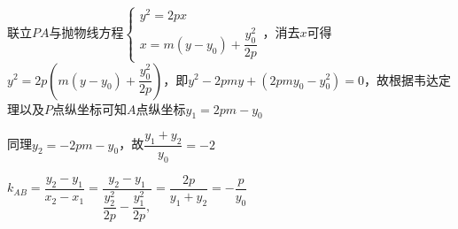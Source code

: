 \begin{enumerate}
\begin{jieda}
\begin{enumerate}
            联立$PA$与抛物线方程$\left\{\begin{array}{l}
                 y^2 = 2px \\
                 x = m(y - y_0) + \dfrac{y_0^2}{2p}
            \end{array}\right.$，消去$x$可得$y^2 = 2p\left(m(y - y_0) + \dfrac{y_0^2}{2p}\right)$，即$y^2 -2pmy + (2pmy_0-y_0^2) = 0$，故根据韦达定理以及$P$点纵坐标可知$A$点纵坐标$y_1 = 2pm - y_0$

            同理$y_2 = -2pm-y_0$，故$\dfrac{{y}_{1} + {y}_{2}}{{y}_{0}} =  - 2$
            
            ${k}_{AB} = \dfrac{y_2-y_1}{x_2-x_1} = \dfrac{y_2-y_1}{\dfrac{y_2^2}{2p} - \dfrac{y_1^2}{2p},} = \dfrac{2p}{y_1+y_2}= - \dfrac{p}{{y}_{0}}$
        \end{enumerate}
    \end{jieda}
\end{enumerate}

